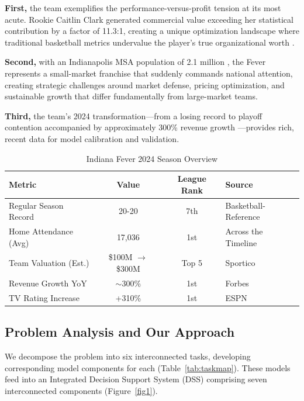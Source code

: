 \documentclass{mcmthesis}
\begin{document}
\textbf{First,} the team exemplifies the performance-versus-profit tension at its most acute. Rookie Caitlin Clark generated commercial value exceeding her statistical contribution by a factor of 11.3:1, creating a unique optimization landscape where traditional basketball metrics undervalue the player's true organizational worth \cite{sportico2024fever}.

\textbf{Second,} with an Indianapolis MSA population of 2.1 million \cite{census2024}, the Fever represents a small-market franchise that suddenly commands national attention, creating strategic challenges around market defense, pricing optimization, and sustainable growth that differ fundamentally from large-market teams.

\textbf{Third,} the team's 2024 transformation---from a losing record to playoff contention accompanied by approximately 300\% revenue growth \cite{forbes2024wnba}---provides rich, recent data for model calibration and validation.

\begin{table}[H]
\centering
\caption{Indiana Fever 2024 Season Overview}
\small
\begin{tabular}{lccl}
\toprule
\textbf{Metric} & \textbf{Value} & \textbf{League Rank} & \textbf{Source} \\
\midrule
Regular Season Record & 20-20 & 7th & Basketball-Reference \cite{bbref2024} \\
Home Attendance (Avg) & 17,036 & 1st & Across the Timeline \cite{att2024} \\
Team Valuation (Est.) & \$100M $\rightarrow$ \$300M & Top 5 & Sportico \cite{sportico2024fever} \\
Revenue Growth YoY & $\sim$300\% & 1st & Forbes \cite{forbes2024wnba} \\
TV Rating Increase & +310\% & 1st & ESPN \cite{espn2024wnba} \\
\bottomrule
\end{tabular}
\end{table}

\subsection{Problem Analysis and Our Approach} 
We decompose the problem into six interconnected tasks, developing corresponding model components for each (Table~\ref{tab:taskmap}). These models feed into an Integrated Decision Support System (DSS) comprising seven interconnected components (Figure~\ref{fig1}).
\end{document}
